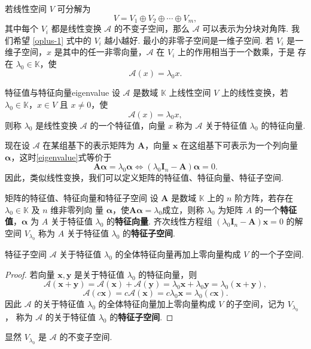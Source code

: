 \documentclass[12pt, a4paper]{ctexart}
\begin{document}
若线性空间 $V$ 可分解为\begin{equation}\label{oplus-1}
	V = V_1 \oplus V_2 \oplus \cdots \oplus V_m,
\end{equation}
其中每个 $V_i$ 都是线性变换 $\mathcal A$ 的不变子空间，那么 $\mathcal A$ 可以表示为分块对角阵. 我们希望 \eqref{oplus-1} 式中的 $V_i$ 越小越好. 最小的非零子空间是一维子空间. 若 $V_i$
是一维子空间，$x$ 是其中的任一非零向量，$\mathcal A$ 在 $V_i$ 上的作用相当于一个数乘，于是
存在 $\lambda_0 \in \mathbb{K}$，使
\[ \mathcal A(x) = \lambda_0 x. \]
\begin{definition}{特征值与特征向量}{eigenvalue}
	设 $\mathcal A$ 是数域 $\mathbb{K}$ 上线性空间 $V$ 上的线性变换，若 $\lambda_0 \in \mathbb{K}$，$x \in V$
	且 $x \neq 0$，使\begin{equation}\label{eigenvalue}
		\mathcal A(x) = \lambda_0 x,
	\end{equation}
	则称 $\lambda_0$ 是线性变换 $\mathcal A$ 的一个特征值，向量 $x$ 称为 $\mathcal A$ 关于特征值 $\lambda_0$ 的特征向量. 
\end{definition}
现在设 $\mathcal A$ 在某组基下的表示矩阵为 $\bm A$，向量 $\bm x$ 在这组基下可表示为一个列向量 $\bm\alpha$，这时\eqref{eigenvalue}式等价于
\begin{equation}
	\bm{A\alpha} = \lambda_0 \bm \alpha\iff(\lambda_0\bm I_n - \bm A)\bm\alpha = 0.
\end{equation}
因此，类似线性变换，我们可以定义矩阵的特征值、特征向量、特征子空间. 
\begin{definition}{矩阵的特征值、特征向量和特征子空间}{}
	设 $\bm A$ 是数域 $\mathbb{K}$ 上的 $n$ 阶方阵，若存在 $\lambda_0 \in \mathbb{K}$ 及 $n$ 维非零列向
	量 $\bm\alpha$，使$\bm{A\alpha} = \lambda_0$成立，则称 $\lambda_0$ 为矩阵 $A$ 的一个\textbf{特征值}，$\bm\alpha$ 为 $A$ 关于特征值 $\lambda_0$
	的\textbf{特征向量}. 齐次线性方程组 $(\lambda_0\bm I_n -\bm A)\bm x = 0$ 的解空间 $V_{\lambda_0}$ 称为 $A$ 关于特征值
	$\lambda_0$ 的\textbf{特征子空间}. 
\end{definition}
\begin{proposition}{特征子空间}{}
	$\mathcal A$ 关于特征值 $\lambda_0$ 的全体特征向量再加上零向量构成 $V$ 的一个子空间. 
\end{proposition}
\begin{proof}
	若向量 $\bm x, \bm y$ 是关于特征值 $\lambda_0$ 的特征向量，则
	\[ \mathcal A(\bm x + \bm y) = \mathcal A(\bm x) + \mathcal A(\bm y) = \lambda_0\bm x + \lambda_0\bm y = \lambda_0 (\bm x + \bm y), \]
	\[ \mathcal A(c\bm x) = c\mathcal A(\bm x) = c\lambda_0\bm x = \lambda_0 (c\bm x). \]
	因此 $\mathcal A$ 的关于特征值 $\lambda_0$ 的全体特征向量加上零向量构成 $V$ 的子空间，记为 $V_{\lambda_0}$，
	称为 $\mathcal A$ 的关于特征值 $\lambda_0$ 的\textbf{特征子空间}.
\end{proof}
显然 $V_{\lambda_0}$ 是 $\mathcal A$ 的不变子空间. 
\end{document}
